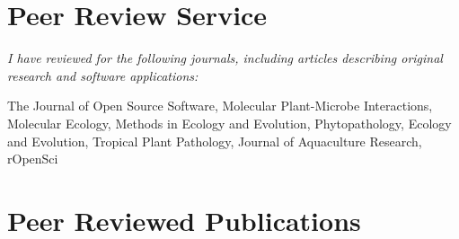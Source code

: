 
\section{Peer Review Service}

\textit{I have reviewed for the following journals, including articles describing
original research and software applications:}

The Journal of Open Source Software, Molecular Plant-Microbe Interactions,
Molecular Ecology, Methods in Ecology and Evolution, Phytopathology, Ecology
and Evolution, Tropical Plant Pathology, Journal of Aquaculture Research, 
rOpenSci

\section{Peer Reviewed Publications}

